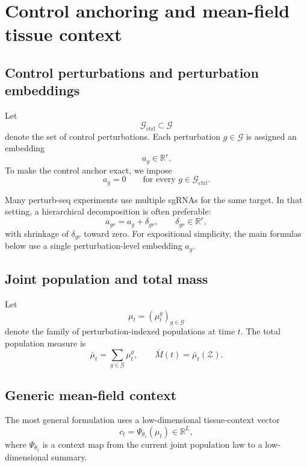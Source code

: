 \documentclass[11pt]{article}
\newcommand{\R}{\mathbb{R}}
\newcommand{\Gcal}{\mathcal{G}}
\newcommand{\Gctrl}{\mathcal{G}_{\mathrm{ctrl}}}
\newcommand{\Zcal}{\mathcal{Z}}
\begin{document}
\section{Control anchoring and mean-field tissue context}

\subsection{Control perturbations and perturbation embeddings}

Let
\[
\Gctrl \subset \Gcal
\]
denote the set of control perturbations. Each perturbation $g\in\Gcal$ is assigned an embedding
\[
a_g \in \R^r.
\]
To make the control anchor exact, we impose
\begin{equation}
a_g = 0
\qquad
\text{for every } g\in\Gctrl.
\label{eq:control_zero}
\end{equation}

Many perturb-seq experiments use multiple sgRNAs for the same target. In that setting, a hierarchical decomposition is often preferable:
\begin{equation}
a_{gr} = a_g + \delta_{gr},
\qquad
\delta_{gr}\in\R^r,
\label{eq:guide_hierarchy}
\end{equation}
with shrinkage of $\delta_{gr}$ toward zero. For expositional simplicity, the main formulas below use a single perturbation-level embedding $a_g$.

\subsection{Joint population and total mass}

Let
\[
\mu_t = (\mu_t^g)_{g\in\Gcal}
\]
denote the family of perturbation-indexed populations at time $t$. The total population measure is
\begin{equation}
\bar\mu_t = \sum_{g\in\Gcal}\mu_t^g,
\qquad
\bar M(t)=\bar\mu_t(\Zcal).
\label{eq:global_population}
\end{equation}

\subsection{Generic mean-field context}

The most general formulation uses a low-dimensional tissue-context vector
\begin{equation}
c_t = \Psi_{\theta_c}(\mu_t)\in\R^L,
\label{eq:generic_context}
\end{equation}
where $\Psi_{\theta_c}$ is a context map from the current joint population law to a low-dimensional summary.
\end{document}
